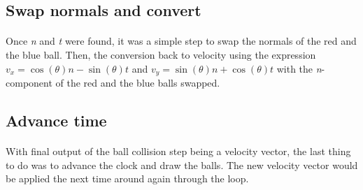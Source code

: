 \documentclass[12pt,final]{report}
\begin{document}
\subsection{Swap normals and convert}
\paragraph{}	Once \textit{n} and \textit{t} were found, it was a simple step to swap the normals of the red and the blue ball. Then, the conversion back to velocity using the expression 
\(v_x = \cos(\theta)n - \sin(\theta)t\) and \(v_y = \sin(\theta)n + \cos(\theta)t\) with the \textit{n}-component of the red and the blue balls swapped.

\subsection{Advance time}
\paragraph{}	With final output of the ball collision step being a velocity vector, the last thing to do was to advance the clock and draw the balls. The new velocity vector would be applied the next time around again through the loop.
\end{document}

